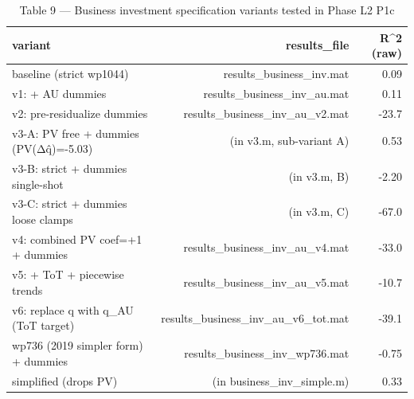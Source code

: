 \begin{table}[ht]
\centering
\caption{Table 9 — Business investment specification variants tested in Phase L2 P1c}
\begin{tabular}{lrr}
\toprule
variant & results_file & R^2 (raw) \\
\midrule
baseline (strict wp1044) & results_business_inv.mat & 0.09 \\
v1: + AU dummies & results_business_inv_au.mat & 0.11 \\
v2: pre-residualize dummies & results_business_inv_au_v2.mat & -23.7 \\
v3-A: PV free + dummies (PV(Δq̂)=-5.03) & (in v3.m, sub-variant A) & 0.53 \\
v3-B: strict + dummies single-shot & (in v3.m, B) & -2.20 \\
v3-C: strict + dummies loose clamps & (in v3.m, C) & -67.0 \\
v4: combined PV coef=+1 + dummies & results_business_inv_au_v4.mat & -33.0 \\
v5: + ToT + piecewise trends & results_business_inv_au_v5.mat & -10.7 \\
v6: replace q with q_AU (ToT target) & results_business_inv_au_v6_tot.mat & -39.1 \\
wp736 (2019 simpler form) + dummies & results_business_inv_wp736.mat & -0.75 \\
simplified (drops PV) & (in business_inv_simple.m) & 0.33 \\
\bottomrule
\end{tabular}
\end{table}
